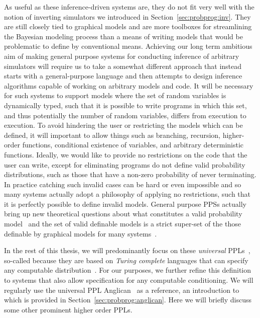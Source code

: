 As useful as these inference-driven systems are, they do not fit very well with the notion of
inverting simulators we introduced in Section~\ref{sec:probprog:inv}.  They are still closely tied
to graphical models and are more toolboxes for streamlining the Bayesian modeling process than
a means of writing models that would be problematic to define by conventional means.  Achieving
our long term ambitious aim of making general purpose systems for conducting inference of
arbitrary simulators will require us to take a somewhat different approach that instead starts
with a general-purpose language and then attempts to design inference algorithms capable of
working on arbitrary models and code.  It will be necessary for such systems to
support models where the set of random variables is dynamically typed, such that it is possible 
to write programs in which this set, and thus potentially the number of random variables, differs 
from execution to execution.  To avoid hindering the user or restricting the models which can be
defined, it will important to allow 
things such as branching, recursion, higher-order functions,
conditional existence of variables, and arbitrary
deterministic functions.  Ideally, we would like to provide no restrictions on the code that the user
can write, except for eliminating programs do not define valid probability distributions, such as
those that have a non-zero probability of never terminating.  In practice catching such invalid cases can
be hard or even impossible and so many systems actually adopt a philosophy of applying no restrictions,
such that it is perfectly possible to define invalid models.  General purpose PPSs actually bring up new
theoretical questions about what constitutes a valid probability model~\citep{heunen2017convenient} and
the set of valid definable models is a strict super-set of the those definable by graphical models 
for many systems~\citep{goodman2013principles}.

In the rest of this thesis, we will predominantly focus on these \emph{universal} PPLs~\citep{goodman_uai_2008,staton2016semantics}, 
so-called because they are based on \emph{Turing complete} languages that can specify any
computable distribution~\citep{goodman2013principles}.  For our purposes, we further refine this definition
to systems that also allow specification for any computable conditioning.
We will regularly use the universal PPL Anglican~\citep{wood2014new} as a reference, an introduction
to which is provided in Section~\ref{sec:probprog:anglican}. Here we will briefly discuss some other
prominent higher order PPLs.

